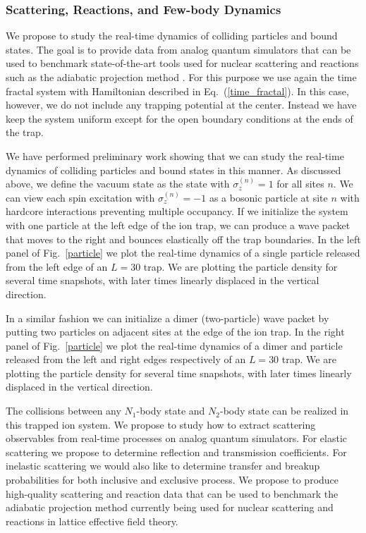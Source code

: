 \documentclass[11pt]{article}
\begin{document}
\subsubsection{Scattering, Reactions, and Few-body Dynamics}

We propose to study the real-time dynamics of colliding particles and
bound states.  The goal is to provide data from analog quantum
simulators that can be used to benchmark state-of-the-art tools used
for nuclear scattering and reactions such as the adiabatic projection
method \cite{Elhatisari:2015iga}.  For this purpose we use again the
time fractal system with Hamiltonian described in
Eq.~(\ref{time_fractal}).  In this case, however, we do not include
any trapping potential at the center.  Instead we have keep the system
uniform except for the open boundary conditions at the ends of the
trap.

We have performed preliminary work showing that we can study the
real-time dynamics of colliding particles and bound states in this
manner.  As discussed above, we define the vacuum state as the state
with $\sigma_z^{(n)}=1$ for all sites $n$.  We can view each spin
excitation with $\sigma_z^{(n)}=-1$ as a bosonic particle at site $n$
with hardcore interactions preventing multiple occupancy. If we
initialize the system with one particle at the left edge of the ion
trap, we can produce a wave packet that moves to the right and bounces
elastically off the trap boundaries. In the left panel of Fig.~\ref{particle} we plot
the real-time dynamics of a single particle released from the left
edge of an $L=30$ trap.  We are plotting the particle density for
several time snapshots, with later times linearly displaced in the
vertical direction.

In a similar fashion we can initialize a dimer (two-particle) wave
packet by putting two particles on adjacent sites at the edge of the
ion trap. In the right panel of Fig.~\ref{particle} we plot the real-time dynamics
of a dimer and particle released from the left and right edges
respectively of an $L=30$ trap.  We are plotting the particle density
for several time snapshots, with later times linearly displaced in the
vertical direction.
 

  The collisions between any $N_1$-body state and $N_2$-body state can
  be realized in this trapped ion system.  We propose to study how to
  extract scattering observables from real-time processes on analog
  quantum simulators.  For elastic scattering we propose to determine
  reflection and transmission coefficients.  For inelastic scattering
  we would also like to determine transfer and breakup probabilities
  for both inclusive and exclusive process. We propose to produce
  high-quality scattering and reaction data that can be used to
  benchmark the adiabatic projection method currently being used for
  nuclear scattering and reactions in lattice effective field theory.
\end{document}
